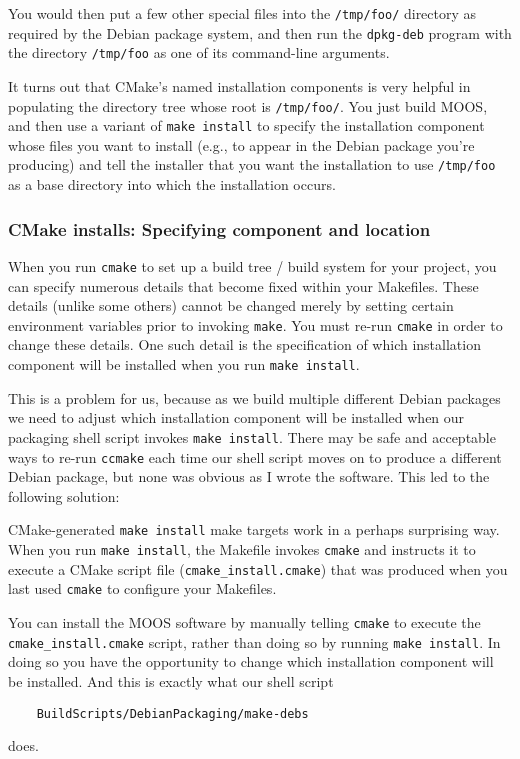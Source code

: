 \documentclass[letterpaper,10pt]{article}
\begin{document}
You would then put a few other special files into the \verb|/tmp/foo/| directory 
as required by the Debian package system, and then run the \verb|dpkg-deb| program
with the directory \verb|/tmp/foo| as one of its command-line arguments.

It turns out that CMake's named installation components is very helpful in populating
the directory tree whose root is \verb|/tmp/foo/|.  You just build MOOS, and then
use a variant of \verb|make install| to specify the installation component whose
files you want to install (e.g., to appear in the Debian package you're producing)
and tell the installer that you want the installation to use \verb|/tmp/foo| as a
base directory into which the installation occurs.

\subsubsection{CMake installs: Specifying component and location}

When you run \verb|cmake| to set up a build tree / build system for your project, 
you can specify numerous details that become fixed within your Makefiles.  These
details (unlike some others) cannot be changed merely by setting certain environment
variables prior to invoking \verb|make|.  You must re-run \verb|cmake| in order to
change these details.  One such detail is the specification of which installation
component will be installed when you run \verb|make install|.

This is a problem for us, because as we build multiple different Debian packages
we need to adjust which installation component will be installed when our packaging
shell script invokes \verb|make install|.  There may be safe and acceptable ways to
re-run \verb|ccmake| each time our shell script moves on to produce a different 
Debian package, but none was obvious as I wrote the software.  This led to the following
solution:

CMake-generated \verb|make install| make targets work in a perhaps surprising way.
When you run \verb|make install|, the Makefile invokes \verb|cmake| and instructs it
to execute a CMake script file (\verb|cmake_install.cmake|) that was produced when 
you last used \verb|cmake| to configure your Makefiles.  

You can install the MOOS software by manually telling \verb|cmake| to execute the \verb|cmake_install.cmake| script, rather than doing so by running \verb|make install|.
In doing so you have the opportunity to change which installation component will be 
installed.  And this is exactly what our shell script 
\begin{verbatim}
    BuildScripts/DebianPackaging/make-debs
\end{verbatim} 
does.  
\end{document}
